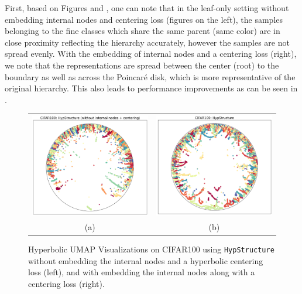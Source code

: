 First, based on Figures  and , one can note that in the leaf-only setting without embedding internal nodes and centering loss (figures on the left), the samples belonging to the fine classes which share the same parent (same color) are in close proximity reflecting the hierarchy accurately, however the samples are not spread evenly. With the embedding of internal nodes and a centering loss (right), we note that the representations are spread between the center (root) to the boundary as well as across the Poincaré disk, which is more representative of the original hierarchy. This also leads to performance improvements as can be seen in . 

\begin{figure}[ht]
\centering
\begin{tabular}{cc}
\includegraphics[width=.35\textwidth]{figures/hypstructure_poincare_disk_cifar100_without_internal_centering.png}&
\includegraphics[width=.35\textwidth]{figures/hypstructure_poincare_disk_cifar100.png}\\
{ (a)}&{ (b)} 
\end{tabular}
\caption{Hyperbolic UMAP Visualizations on CIFAR100 using \texttt{HypStructure} without embedding the internal nodes and a hyperbolic centering loss (left), and with embedding the internal nodes along with a centering loss (right).}
\label{fig:rebuttal_viz_3}
\end{figure}


